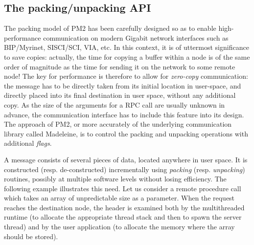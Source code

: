 \subsection{The packing/unpacking API}

The packing model of PM2 has been carefully designed so as to enable
high-performance communication on modern Gigabit network interfaces
such as BIP/Myrinet, SISCI/SCI, VIA, etc. In this context, it is of
uttermost significance to save copies: actually, the time for copying
a buffer within a node is of the same order of magnitude as the time
for sending it on the network to some remote node!  The key for
performance is therefore to allow for \emph{zero-copy}
communication: the message has to be directly taken from its initial
location in user-space, and directly placed into its final destination
in user space, without any additional copy. As the size of the
arguments for a RPC call are usually unknown in advance, the
communication interface has to include this feature into its design.
The approach of PM2, or more accurately of the underlying
communication library called Madeleine, is to control the packing and
unpacking operations with additional \emph{flags}.

A message consists of several pieces of data, located anywhere in
user space. It is constructed (resp. de-constructed) incrementally
using \emph{packing} (resp. \emph{unpacking}) routines, possibly at
multiple software levels without losing efficiency. The following
example illustrates this need. Let us consider a remote procedure call
which takes an array of unpredictable size as a parameter. When the
request reaches the destination node, the header is examined both by
the multithreaded runtime (to allocate the appropriate thread stack
and then to spawn the server thread) and by the user application (to
allocate the memory where the array should be stored).

